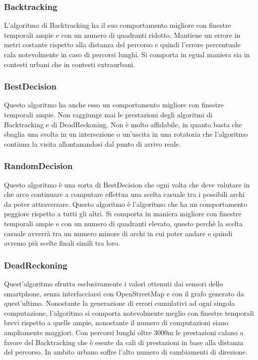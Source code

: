 \documentclass[12pt,a4paper,openright,twoside]{report}
\begin{document}
\subsubsection{Backtracking}
L'algoritmo di Backtracking ha il suo comportamento migliore con finestre temporali ampie e con un numero di quadranti ridotto. Mantiene un errore in metri  costante rispetto alla distanza del percorso e quindi l'errore percentuale cala notevolmente in caso di percorsi lunghi. Si comporta in egual maniera sia in contesti urbani che in contesti extraurbani.

\subsubsection{BestDecision}
Questo algoritmo ha anche esso un comportamento migliore con finestre temporali ampie. Non raggiunge mai le prestazioni degli algoritmi di Backtracking e di DeadReckoning. Non è molto affidabile, in quanto basta che sbaglia una svolta in un intersezione o un'uscita in una rotatoria che l'algoritmo continua la visita allontanandosi dal punto di arrivo reale.

\subsubsection{RandomDecision}
Questo algoritmo è una sorta di BestDecision che ogni volta che deve valutare in che arco continuare a computare effettua una scelta casuale tra i possibili archi da poter attraversare. Questo algoritmo è l'algoritmo che ha un comportamento peggiore rispetto a tutti gli altri. Si comporta in maniera migliore con finestre temporali ampie e con un numero di quadranti elevato, questo perchè la scelta casuale avverrà tra un numero minore di archi in cui poter andare e quindi avremo più scelte finali simili tra loro.

\subsubsection{DeadReckoning}
Quest'algoritmo sfrutta esclusivamente i valori ottenuti dai sensori dello smartphone, senza interfacciarsi con OpenStreetMap e con il grafo generato da quest'ultimo. Nonostante la generazione di errori cumulativi ad ogni singola computazione, l'algoritmo si comporta notevolmente meglio con finestre temporali brevi rispetto a quelle ampie, nonostante il numero di computazioni siano ampliamente maggiori.
Con percorsi lunghi oltre 3000m le prestazioni calano a favore del Backtracking che è esente da cali di prestazioni in base alla distanza del percorso. In ambito urbano soffre l'alto numero di cambiamenti di direzione.
\end{document}
